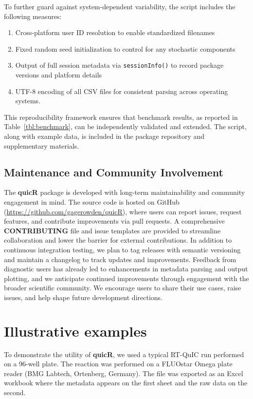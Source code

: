 \documentclass[preprint,12pt,a4paper]{elsarticle}
\begin{document}
            To further guard against system-dependent variability, the script includes the following measures:

            \begin{enumerate}
                \item Cross-platform user ID resolution to enable standardized filenames
                \item Fixed random seed initialization to control for any stochastic components
                \item Output of full session metadata via \texttt{sessionInfo()} to record package versions and platform details
                \item UTF-8 encoding of all CSV files for consistent parsing across operating systems.
            \end{enumerate}

            This reproducibility framework ensures that benchmark results, as reported in Table~\ref{tbl:benchmark}, can be independently validated and extended. The script, along with example data, is included in the package repository and supplementary materials.

        \subsection{Maintenance and Community Involvement}
            The \textbf{quicR} package is developed with long-term maintainability and community engagement in mind. The source code is hosted on GitHub (\url{https://github.com/gagerowden/quicR}), where users can report issues, request features, and contribute improvements via pull requests. A comprehensive \textbf{CONTRIBUTING} file and issue templates are provided to streamline collaboration and lower the barrier for external contributions. In addition to continuous integration testing, we plan to tag releases with semantic versioning and maintain a changelog to track updates and improvements. Feedback from diagnostic users has already led to enhancements in metadata parsing and output plotting, and we anticipate continued improvements through engagement with the broader scientific community. We encourage users to share their use cases, raise issues, and help shape future development directions.

    \section{Illustrative examples}
        To demonstrate the utility of \textbf{quicR}, we used a typical RT-QuIC run performed on a 96-well plate. The reaction was performed on a FLUOstar Omega plate reader (BMG Labtech, Ortenberg, Germany). The file was exported as an Excel workbook where the metadata appears on the first sheet and the raw data on the second.
        
\end{document}
